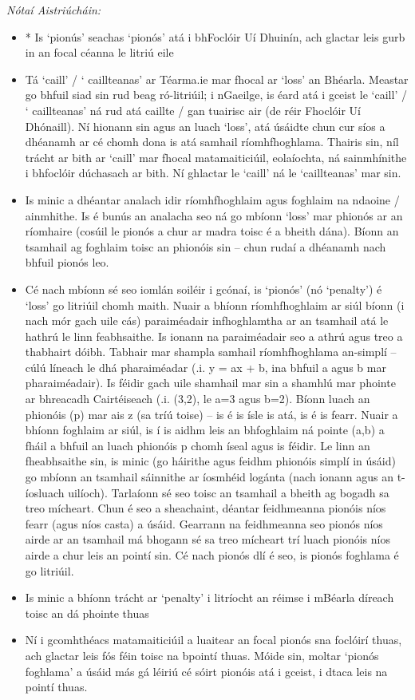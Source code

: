  \noindent \textit{Nótaí Aistriúcháin:}
\begin{itemize}
	\item * Is `pionús' seachas `pionós' atá i bhFoclóir Uí Dhuinín, ach glactar leis gurb in an focal céanna le litriú eile
	\item Tá `caill' / ` caillteanas' ar Téarma.ie mar fhocal ar `loss' an Bhéarla. Meastar go bhfuil siad sin rud beag ró-litriúil; i nGaeilge, is éard atá i gceist le `caill' / ` caillteanas' ná rud atá caillte / gan tuairisc air (de réir Fhoclóir Uí Dhónaill). Ní hionann sin agus an luach `loss', atá úsáidte chun cur síos a dhéanamh ar cé chomh dona is atá samhail ríomhfhoghlama. Thairis sin, níl trácht ar bith ar `caill' mar fhocal matamaiticiúil, eolaíochta, ná sainmhínithe i bhfoclóir dúchasach ar bith. Ní ghlactar le `caill' ná le `caillteanas' mar sin.
	\item Is minic a dhéantar analach idir ríomhfhoghlaim agus foghlaim na ndaoine / ainmhithe. Is é bunús an analacha seo ná go mbíonn `loss' mar phionós ar an ríomhaire (cosúil le pionós a chur ar madra toisc é a bheith dána). Bíonn an tsamhail ag foghlaim toisc an phionóis sin -- chun rudaí a dhéanamh nach bhfuil pionós leo.
	\item Cé nach mbíonn sé seo iomlán soiléir i gcónaí, is `pionós' (nó `penalty') é `loss' go litriúil chomh maith. Nuair a bhíonn ríomhfhoghlaim ar siúl bíonn (i nach mór gach uile cás) paraiméadair infhoghlamtha ar an tsamhail atá le hathrú le linn feabhsaithe. Is ionann na paraiméadair seo a athrú agus treo a thabhairt dóibh. Tabhair mar shampla samhail ríomhfhoghlama an-simplí -- cúlú líneach le dhá pharaiméadar (.i. y = ax + b, ina bhfuil a agus b mar pharaiméadair). Is féidir gach uile shamhail mar sin a shamhlú mar phointe ar bhreacadh Cairtéiseach (.i. (3,2), le a=3 agus b=2). Bíonn luach an phionóis (p) mar ais z (sa tríú toise) -- is é is ísle is atá, is é is fearr. Nuair a bhíonn foghlaim ar siúl, is í is aidhm leis an bhfoghlaim ná pointe (a,b) a fháil a bhfuil an luach phionóis p chomh íseal agus is féidir. Le linn an fheabhsaithe sin, is minic (go háirithe agus feidhm phionóis simplí in úsáid) go mbíonn an tsamhail sáinnithe ar íosmhéid logánta (nach ionann agus an t-íosluach uilíoch). Tarlaíonn sé seo toisc an tsamhail a bheith ag bogadh sa treo mícheart. Chun é seo a sheachaint, déantar feidhmeanna pionóis níos fearr (agus níos casta) a úsáid. Gearrann na feidhmeanna seo pionós níos airde ar an tsamhail má bhogann sé sa treo mícheart trí luach pionóis níos airde a chur leis an pointí sin. Cé nach pionós dlí é seo, is pionós foghlama é go litriúil.
	\item Is minic a bhíonn trácht ar `penalty' i litríocht an réimse i mBéarla díreach toisc an dá phointe thuas
	\item Ní i gcomhthéacs matamaiticiúil a luaitear an focal pionós sna foclóirí thuas, ach glactar leis fós féin toisc na bpointí thuas. Móide sin, moltar `pionós foghlama' a úsáid más gá léiriú cé sóirt pionóis atá i gceist, i dtaca leis na pointí thuas.
\end{itemize}


